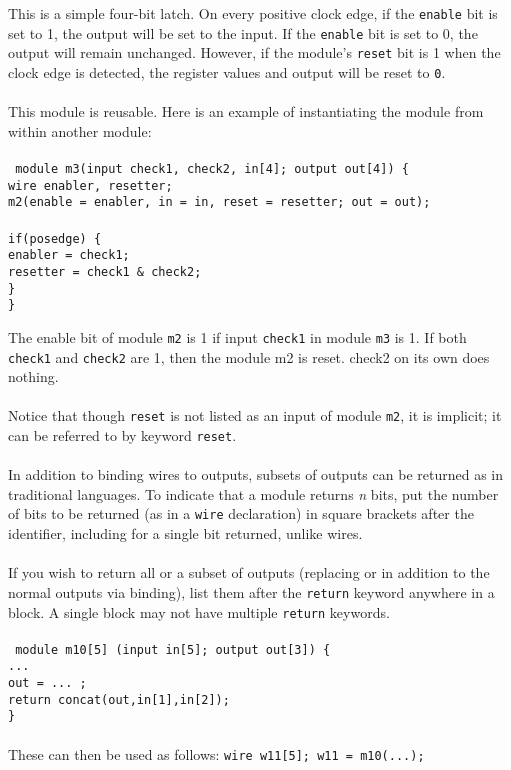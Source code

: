 \documentclass[letterpaper,11pt]{article}
\newcommand{\tab}{\hspace*{2em}}
\begin{document}
        This is a simple four-bit latch. On every positive clock edge, if the \texttt{enable} bit is set to 1, 
        the output will be set to the input. If the \texttt{enable} bit is set to 0, the output will remain 
        unchanged. However, if the module's \texttt{reset} bit is 1 when the clock edge is detected, the 
        register values and output will be reset to \texttt{0}.\\\\
        This module is reusable. Here is an example of instantiating the module from within another module: \\\\
        \texttt{
        module m3(input check1, check2, in[4]; output out[4]) \{ \\
        \tab wire enabler, resetter; \\
        \tab m2(enable = enabler, in = in, reset = resetter; out = out); \\\\
        \tab if(posedge) \{ \\
        \tab\tab enabler = check1; \\
        \tab\tab resetter = check1 \& check2; \\
        \tab \}  \\
        \}}
        
        The enable bit of module \texttt{m2} is 1 if input \texttt{check1} in module \texttt{m3} is 1. If both 
        \texttt{check1} and \texttt{check2} are 1, then the module m2 is reset. check2 on its own does nothing.\\\\
        Notice that though \texttt{reset} is not listed as an input of module  \texttt{m2}, it is implicit; it can be 
        referred to by keyword \texttt{reset}.	\\\\
        In addition to binding wires to outputs, subsets of outputs can be returned as in traditional 
        languages.  To indicate that a module returns \emph{n} bits, put the number of bits to be returned 
        (as in a \texttt{wire} declaration) in square brackets after the identifier, including for a single 
        bit returned, unlike wires.\\\\  
        If you wish to return all or a subset of outputs (replacing or in addition to the normal outputs 
        via binding), list them after the \texttt{return} keyword anywhere in a block.  A single block may not 
        have multiple \texttt{return} keywords. \\\\
        \texttt{
        module m10[5] (input in[5]; output out[3]) \{ \\
        \tab ... \\
        \tab out = ... ; \\
        \tab return concat(out,in[1],in[2]); \\
        \}}\\\\
        These can then be used as follows:
        \texttt{wire w11[5]; w11 = m10(...);}
        
\end{document}
